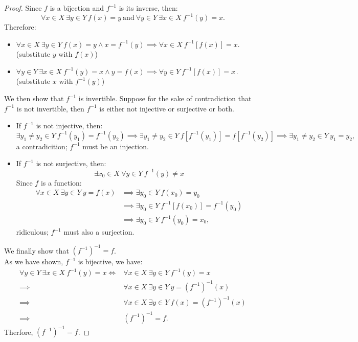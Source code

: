 \documentclass[a4paper]{book}
\newtheorem*{proof}{\textit{Proof.}}
\theoremstyle{break}
\begin{document}
			\begin{proof}Since $f$ is a bijection and $f^{-1}$ is its inverse, then:
				$$\forall x\in X~\exists y\in Y~f(x)=y~\text{and}~\forall y\in Y~\exists x\in X~f^{-1}(y)=x.$$
				Therefore:
				\begin{itemize}
					\item  $\forall x\in X~\exists y\in Y~f(x)=y\land x=f^{-1}(y)\implies\forall x\in X~f^{-1}[f(x)]=x$.(substitute $y$ with $f(x)$)
					\item $\forall y\in Y~\exists x\in X~f^{-1}(y)=x\land y=f(x)\implies\forall y\in Y~f^{-1}[f(x)]=x\mspace{2mu}$.(substitute $x$ with $f^{-1}(y)$)
				\end{itemize}
				We then show that $f^{-1}$ is invertible. Suppose for the sake of contradiction that $f^{-1}$ is not invertible, then $f^{-1}$ is either not injective or surjective or both.
				\begin{itemize}
					\item If $f^{-1}$ is not injective, then:
					$$\exists y_1\neq y_2\in Y~f^{-1}(y_1)=f^{-1}(y_2)\implies\exists y_1\neq y_2\in Y~f[f^{-1}(y_1)]=f[f^{-1}(y_2)]\implies\exists y_1\neq y_2\in Y~y_1=y_2,$$
					a contradicition; $f^{-1}$ must be an injection.
					\item If $f^{-1}$ is not surjective, then:
					$$\exists x_0\in X~\forall y\in Y~f^{-1}(y)\neq x$$
					Since $f$ is a function:
					\begin{align*}
						\forall x\in X~\exists y\in Y~y=f(x)&\implies\exists y_0\in Y~f(x_0)=y_0\\
						&\implies\exists y_0\in Y~f^{-1}[f(x_0)]=f^{-1}(y_0)\\
						&\implies\exists y_0\in Y~f^{-1}(y_0)=x_0,
					\end{align*}
					ridiculous; $f^{-1}$ must also a surjection.
				\end{itemize}
				We finally show that $(f^{-1})^{-1}=f$.\\
				As we have shown, $f^{-1}$ is bijective, we have:
				\begin{align*}
					\forall y\in Y~\exists x\in X~f^{-1}(y)=x\iff&\forall x\in X~\exists y\in Y~f^{-1}(y)=x\\
					\implies&\forall x\in X~\exists y\in Y~y=(f^{-1})^{-1}(x)\\
					\implies&\forall x\in X~\exists y\in Y~f(x)=(f^{-1})^{-1}(x)\\
					\implies&(f^{-1})^{-1}=f.
				\end{align*}
				Therfore, $(f^{-1})^{-1}=f$.
			\end{proof}
\end{document}
